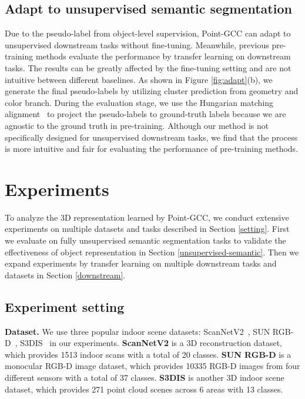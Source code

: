 \documentclass{article}
\begin{document}
\subsection{Adapt to unsupervised semantic segmentation}
\label{sec:adapt}
\vspace{-0.25cm}
Due to the pseudo-label from object-level supervision, Point-GCC can adapt to unsupervised downstream tasks without fine-tuning. 
Meanwhile, previous pre-training methods evaluate the performance by transfer learning on downstream tasks. The results can be greatly affected by the fine-tuning setting and are not intuitive between different baselines. 
As shown in Figure \ref{fig:adapt}(b), we generate the final pseudo-labels by utilizing cluster prediction from geometry and color branch. During the evaluation stage, we use the Hungarian matching alignment~\cite{DeepAlignedClustering} to project the pseudo-labels to ground-truth labels because we are agnostic to the ground truth in pre-training. Although our method is not speciﬁcally designed for unsupervised downstream tasks, we find that the process is more intuitive and fair for evaluating the performance of pre-training methods. \section{Experiments}
\vspace{-0.2cm}
To analyze the 3D representation learned by Point-GCC, we conduct extensive experiments on multiple datasets and tasks described in Section \ref{setting}. First we evaluate on fully unsupervised semantic segmentation tasks to validate the effectiveness of object representation in Section \ref{unsupervised-semantic}. Then we expand experiments by transfer learning on multiple downstream tasks and datasets in Section \ref{downstream}.
\subsection{Experiment setting}
\vspace{-0.25cm}
\label{setting}
\textbf{Dataset. } We use three popular indoor scene datasets: ScanNetV2~\cite{dai2017scannet}, SUN RGB-D~\cite{song2015sun}, S3DIS~\cite{armeni_cvpr16} in our experiments. \textbf{ScanNetV2} is a 3D reconstruction dataset, which provides 1513 indoor scans with a total of 20 classes. \textbf{SUN RGB-D} is a monocular RGB-D image dataset, which provides 10335 RGB-D images from four different sensors with a total of 37 classes. \textbf{S3DIS} is another 3D indoor scene dataset, which provides 271 point cloud scenes across 6 areas with 13 classes.
\end{document}
